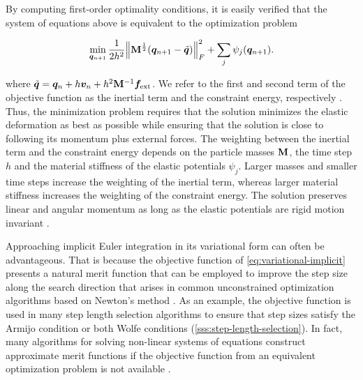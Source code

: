 \noindent By computing first-order optimality conditions, it is easily verified that the system of equations above is equivalent to the optimization 
problem

\begin{equation}\label{eq:variational-implicit}
    \min_{\bm{q}_{n+1}} \frac{1}{2h^2} \norm{\mathbf{M}^{\frac{1}{2}}(\bm{q}_{n+1} - \tilde{\bm{q}})}^2_F + \sum_j \psi_j(\bm{q}_{n+1}).
\end{equation}

\noindent where $\tilde{\bm{q}} = \bm{q}_n + h\bm{v}_n + h^2\mathbf{M}^{-1}\bm{f}_{\text{ext}}$.  
We refer to the first and second term of the objective function as the inertial term and the constraint energy, respectively \cite{bouaziz2014}. 
Thus, the minimization problem requires that the solution minimizes the elastic deformation as best as possible while ensuring that the solution is 
close to following its momentum plus external forces. The weighting between the inertial term and the constraint energy depends on the 
particle masses $\mathbf{M}$, the time step $h$ and the material stiffness of the elastic potentials $\psi_j$. Larger masses and smaller time steps 
increase the weighting of the inertial term, whereas larger material stiffness increases the weighting of the constraint energy. 
The solution preserves linear and angular momentum as long as the elastic potentials are rigid motion invariant \cite{bouaziz2014}.

Approaching implicit Euler integration in its variational form can often be advantageous. That is because the objective function of 
\autoref{eq:variational-implicit} presents a natural merit function that can be employed to improve the step size along the search direction 
that arises in common unconstrained optimization algorithms based on Newton's method \cite{nocedal2006}. As an example, the objective 
function is used in many step length selection algorithms to ensure that step sizes satisfy the Armijo condition or both Wolfe conditions 
(\cref{sss:step-length-selection}). In fact, many algorithms for solving non-linear systems of equations construct approximate merit functions 
if the objective function from an equivalent optimization problem is not available \cite{nocedal2006}.


